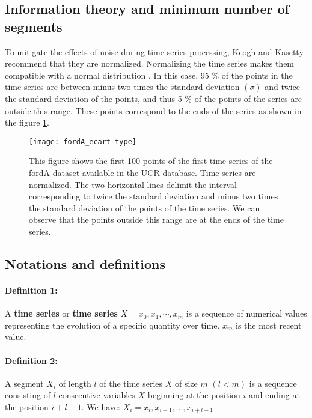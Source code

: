 \subsection{Information theory and minimum number of segments}
To mitigate the effects of noise during time series processing, Keogh and Kasetty \cite{KeoghBenchmarks} recommend that they are normalized. Normalizing the time series makes them compatible with a normal distribution \cite{Lin2007}. In this case, 95 \% of the points in the time series are between minus two times the standard deviation $ (\sigma) $ and twice the standard deviation of the points, and thus 5 \% of the points of the series are outside this range. These points correspond to the ends of the series as shown in the figure \ref{standard_deviation}.


\begin{figure}
\centering
\texttt{[image: fordA\_ecart-type]}
\caption{This figure shows the first 100 points of the first time series  of the fordA dataset available in the UCR \cite{UCRArchive} database. Time series are normalized. The two horizontal lines delimit the interval corresponding to twice the standard deviation and minus two times the standard deviation of the points of the time series. We can observe that the points outside this range are at the ends of the time series.}
\label{standard_deviation} 
\end{figure}



\subsection{Notations and definitions}
\paragraph{Definition 1:} A \textbf{time series} or \textbf{time series}
$ X = x_{0}, x_{1}, \cdots, x_{m} $ is a sequence of numerical values representing the evolution of a specific quantity over time. $ x_{m} $ is the most recent value.

\paragraph{Definition 2:} A segment $ X_{i} $ of length $ l $ of the time series
$ X $ of size $ m $ $ (l <m) $ is a sequence consisting of $ l $ consecutive variables
$ X $ beginning at the  position  $ i $  and ending at the position $ i + l-1 $.
We have: $ X_{i} = x_{i}, x_{i + 1}, ..., x_{i + l-1} $

